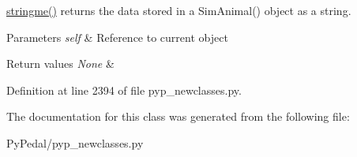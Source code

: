 \hyperlink{classPyPedal_1_1pyp__newclasses_1_1SimAnimal_a7be8292fd4f0713e344461670ca6c47b}{stringme()} returns the data stored in a SimAnimal() object as a string. 


\begin{DoxyParams}{Parameters}
{\em self} & Reference to current object \\
\hline
\end{DoxyParams}

\begin{DoxyRetVals}{Return values}
{\em None} & \\
\hline
\end{DoxyRetVals}


Definition at line 2394 of file pyp\_\-newclasses.py.



The documentation for this class was generated from the following file:\begin{DoxyCompactItemize}
\item 
PyPedal/pyp\_\-newclasses.py\end{DoxyCompactItemize}
